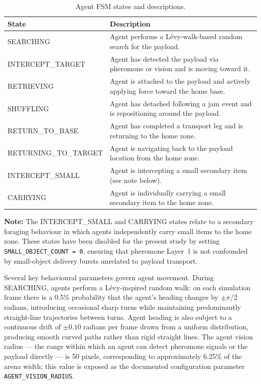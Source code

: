 \begin{table}[H]
\centering
\caption{Agent FSM states and descriptions.}
\label{tab:fsm_states}
\begin{tabular}{@{}ll@{}}
\toprule
\textbf{State} & \textbf{Description} \\
\midrule
SEARCHING & Agent performs a Lévy-walk-based random search for the payload. \\
INTERCEPT\_TARGET & Agent has detected the payload via pheromone or vision and is moving toward it. \\
RETRIEVING & Agent is attached to the payload and actively applying force toward the home base. \\
SHUFFLING & Agent has detached following a jam event and is repositioning around the payload. \\
RETURN\_TO\_BASE & Agent has completed a transport leg and is returning to the home zone. \\
RETURNING\_TO\_TARGET & Agent is navigating back to the payload location from the home zone. \\
INTERCEPT\_SMALL & Agent is intercepting a small secondary item (see note below). \\
CARRYING & Agent is individually carrying a small secondary item to the home zone. \\
\bottomrule
\end{tabular}
\end{table}

\noindent\textbf{Note:} The INTERCEPT\_SMALL and CARRYING states relate to a secondary foraging behaviour in which agents independently carry small items to the home zone. These states have been disabled for the present study by setting \texttt{SMALL\_OBJECT\_COUNT = 0}, ensuring that pheromone Layer~1 is not confounded by small-object delivery bursts unrelated to payload transport.

Several key behavioural parameters govern agent movement. During SEARCHING, agents perform a Lévy-inspired random walk: on each simulation frame there is a 0.5\% probability that the agent's heading changes by $\pm\pi/2$ radians, introducing occasional sharp turns while maintaining predominantly straight-line trajectories between turns. Agent heading is also subject to a continuous drift of $\pm0.10$ radians per frame drawn from a uniform distribution, producing smooth curved paths rather than rigid straight lines. The agent vision radius — the range within which an agent can detect pheromone signals or the payload directly — is 50 pixels, corresponding to approximately 6.25\% of the arena width; this value is exposed as the documented configuration parameter \texttt{AGENT\_VISION\_RADIUS}.

